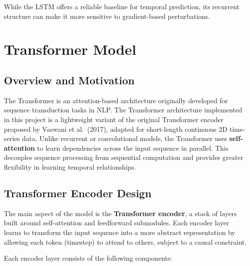 While the LSTM offers a reliable baseline for temporal prediction, its recurrent structure can make it more sensitive to gradient-based perturbations.

\section{Transformer Model}

\subsection*{Overview and Motivation}
The Transformer is an attention-based architecture originally developed for sequence transduction tasks in NLP. The Transformer architecture implemented in this project is a lightweight variant of the original Transformer encoder proposed by Vaswani et al.~(2017), adapted for short-length continuous 2D time-series data. Unlike recurrent or convolutional models, the Transformer uses \textbf{self-attention} to learn dependencies across the input sequence in parallel. This decouples sequence processing from sequential computation and provides greater flexibility in learning temporal relationships.

\subsection*{Transformer Encoder Design}

The main aspect of the model is the \textbf{Transformer encoder}, a stack of layers built around self-attention and feedforward submodules. Each encoder layer learns to transform the input sequence into a more abstract representation by allowing each token (timestep) to attend to others, subject to a causal constraint.

Each encoder layer consists of the following components:

